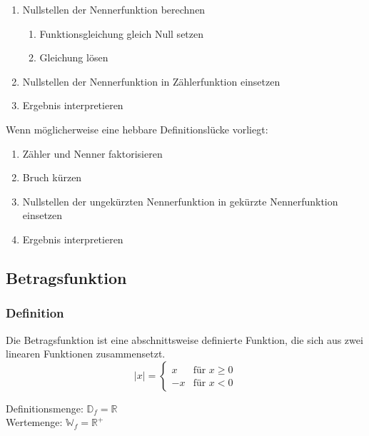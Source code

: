 \begin{multicols}{2}
    \begin{enumerate}
        \item Nullstellen der Nennerfunktion berechnen
              \begin{enumerate}
                  \item Funktionsgleichung gleich Null setzen
                  \item Gleichung lösen
              \end{enumerate}
        \item Nullstellen der Nennerfunktion in Zählerfunktion einsetzen
        \item Ergebnis interpretieren
    \end{enumerate}
    Wenn möglicherweise eine hebbare Definitionslücke vorliegt:
    \begin{enumerate}
        \item Zähler und Nenner faktorisieren
        \item Bruch kürzen
        \item Nullstellen der ungekürzten Nennerfunktion in gekürzte Nennerfunktion einsetzen
        \item Ergebnis interpretieren
    \end{enumerate}

    \subsection{Betragsfunktion}
    \vspace{-4mm}
    \subsubsection{Definition}
    \vspace{-4mm}
    Die Betragsfunktion ist eine abschnittsweise definierte Funktion, die sich aus zwei linearen Funktionen zusammensetzt.
    \[|x| = \begin{cases} x &\text{für } x \geq 0 \\[5px] -x &\text{für } x < 0 \end{cases}\]

    Definitionsmenge: $\mathbb{D}_f = \mathbb{R}$ \\
    Wertemenge: $\mathbb{W}_f = \mathbb{R}^{+}$


\end{multicols}
